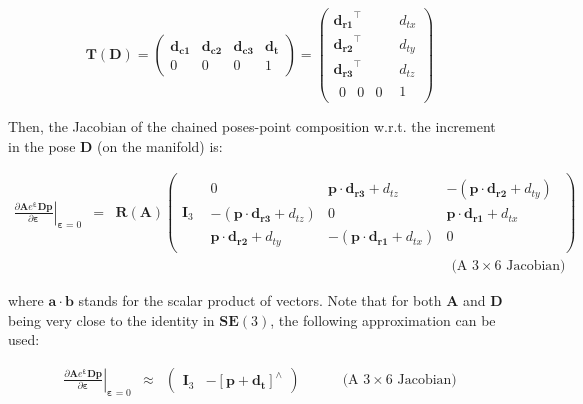 \documentclass[a4paper,11pt]{report}
\newcommand{\E}{{\bm{\varepsilon}}}
\newcommand{\A}{{\mathbf{A}}}
\newcommand{\D}{{\mathbf{D}}}
\newcommand{\I}{{\mathbf{I}}}
\newcommand{\hatop}[1]{#1^\wedge}
\begin{document}
\begin{equation}
\mathbf{T}(\mathbf{D}) =
\left(
\begin{array}{ccc|c}
 \mathbf{d_{c1}}  & \mathbf{d_{c2}}  & \mathbf{d_{c3}}  & \mathbf{d_{t}}  \\
\hline
  0 & 0 & 0 & 1
\end{array}
\right)
=
\left(
\begin{array}{c|c}
    \mathbf{d_{r1}}^\top  & d_{tx}  \\
    \mathbf{d_{r2}}^\top  & d_{ty} \\
    \mathbf{d_{r3}}^\top  & d_{tz} \\
\hline
  \begin{array}{ccc}
    0  & 0  & 0
  \end{array}
    & 1
\end{array}
\right)
\end{equation}


Then, the Jacobian of the chained poses-point composition w.r.t.
the increment in the pose $\D$ (on the manifold) is:

\begin{eqnarray}
\left. \frac{\partial \A e^\E \D \mathbf{p}}{\partial \E} \right|_{\E = 0}
&=&
\mathbf{R}(\A)
\left(
\begin{array}{c|c}
  \I_3 &
    \begin{array}{ccc}
      0  & \mathbf{p} \cdot \mathbf{d_{r3}} + d_{tz}  & -(\mathbf{p} \cdot \mathbf{d_{r2}} + d_{ty}) \\
      -(\mathbf{p} \cdot \mathbf{d_{r3}} + d_{tz})  & 0 & \mathbf{p} \cdot \mathbf{d_{r1}} + d_{tx} \\
      \mathbf{p} \cdot \mathbf{d_{r2}} + d_{ty}  & -(\mathbf{p} \cdot \mathbf{d_{r1}} + d_{tx}) & 0
    \end{array}
\end{array}
\right)
\\
&&
\quad \quad \quad \quad \quad \quad \quad \quad \quad \quad \quad \quad
\quad \quad \quad \quad \quad \quad \quad \quad \quad \quad \quad \quad
\text{(A $3 \times 6$ Jacobian)} \nonumber
\end{eqnarray}

\noindent where $\mathbf{a} \cdot \mathbf{b}$ stands for the scalar product of vectors.
Note that for both $\A$ and $\D$ being very close to the identity in $\mathbf{SE}(3)$,
the following approximation can be used:

\begin{eqnarray}
\left. \frac{\partial \A e^\E \D \mathbf{p}}{\partial \E} \right|_{\E = 0}
& \approx &
\left(
\begin{array}{cc}
  \I_3 &
  - \hatop{\left[ \mathbf{p} + \mathbf{d_t} \right]}
\end{array}
\right)
\quad \quad \quad
\text{(A $3 \times 6$ Jacobian)} \nonumber
\end{eqnarray}
\end{document}
